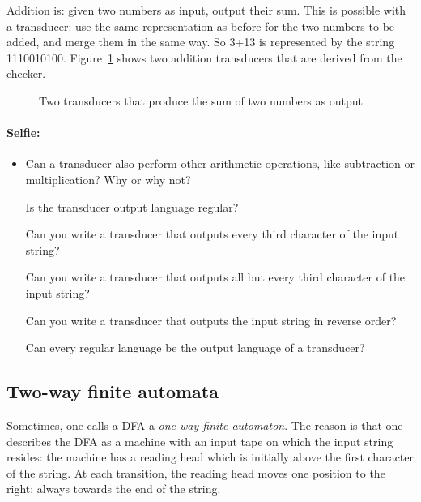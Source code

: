 Addition is: given two numbers as input, output their sum. This is
possible with a transducer: use the same representation as before for
the two numbers to be added, and merge them in the same way. So 3+13
is represented by the string 1110010100. Figure~\ref{telop2} shows two
addition transducers that are derived from the checker.

\begin{figure}[h]
\caption{Two transducers that produce the sum of two numbers as
  output \label{telop2}}
\end{figure}

\paragraph{Selfie:}
\begin{itemize}
\item[]
Can a transducer also perform other arithmetic operations, like
subtraction or multiplication? Why or why not?

Is the transducer output language regular?

Can you write a transducer that outputs every third character of the
input string?

Can you write a transducer that outputs all but every third character
of the input string?

Can you write a transducer that outputs the input string in reverse
order?

Can every regular language be the output language of a transducer?
\end{itemize}

\subsection{Two-way finite automata}

Sometimes, one calls a DFA a {\em one-way finite automaton}. The reason
is that one describes the DFA as a machine with an input tape on which
the input string resides: the machine has a reading head which is
initially above the first character of the string. At each transition,
the reading head moves one position to the right: always towards the
end of the string.

